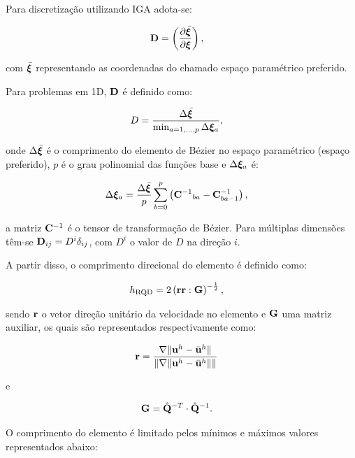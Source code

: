 \documentclass[tese_patricia]{subfiles}
\begin{document}
Para discretização utilizando IGA adota-se:

\begin{align}
	\mathbf{D}&=\left(\frac{\partial\bar{\bm{\xi}}}{\partial\bm{\xi}}\right),
\end{align}

\noindent com $\bar{\bm{\xi}}$ representando as coordenadas do chamado espaço paramétrico preferido. 

Para problemas em 1D, $\mathbf{D}$ é definido como:

\begin{align}
	D&=\frac{\Delta\bar{\bm{\xi}}}{\min_{a=1,...,p} \Delta\bm{\xi}_{a}},
\end{align}

\noindent onde $\Delta\bar{\bm{\xi}}$ é o comprimento do elemento de Bézier no espaço paramétrico (espaço preferido), $p$ é o grau polinomial das funções base e $\Delta\bm{\xi}_{a}$ é:

\begin{align}
	\Delta\bm{\xi}_{a}&=\frac{\Delta\bar{\bm{\xi}}}{p}\sum_{b=0}^{p} \left({\mathbf{C}^{-1}}_{ba} - \mathbf{C}^{-1}_{ba-1}\right),
\end{align}

\noindent a matriz $\mathbf{C}^{-1}$ é o tensor de transformação de Bézier. Para múltiplas dimensões têm-se $\mathbf{D}_{ij} = D^i \delta_{ij} $, com $D^i$ o valor de $D$ na direção $i$.

A partir disso, o comprimento direcional do elemento é definido como:

\begin{align}
	h_{\mathrm{RQD}} &=2\left(\mathbf{r}\mathbf{r} : \mathbf{G} \right)^{-\frac{1}{2}},
\end{align}

\noindent sendo $\mathbf{r}$ o vetor direção unitário da velocidade no elemento e $\mathbf{G}$ uma matriz auxiliar, os quais são representados respectivamente como:

\begin{align}
	\mathbf{r}&=\frac{\nabla \lVert\mathbf{u}^h - \bar{\mathbf{u}}^h\rVert}{\lVert \nabla \lVert\mathbf{u}^h - \bar{\mathbf{u}}^h\rVert\rVert} \label{eq:erRGN}
\end{align}

\noindent e

\begin{align}
	\mathbf{G} &= \hat{\mathbf{Q}}^{-T} \cdot \hat{\mathbf{Q}}^{-1}. 
\end{align}

O comprimento do elemento é limitado pelos mínimos e máximos valores representados abaixo:
\end{document}
